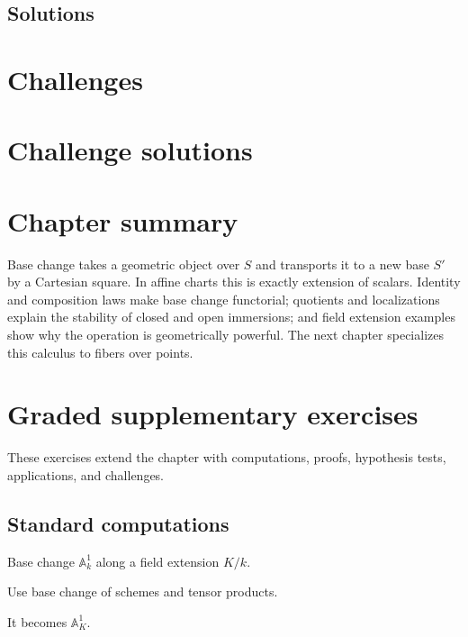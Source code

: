 \subsection*{Solutions}

\fi

\section{Challenges}





\ifdefined\IncludeChallengeSolutions
\section{Challenge solutions}

\fi

\section{Chapter summary}
Base change takes a geometric object over $S$ and transports it to a new base $S'$ by a Cartesian
square.  In affine charts this is exactly extension of scalars.  Identity and composition laws make
base change functorial; quotients and localizations explain the stability of closed and open
immersions; and field extension examples show why the operation is geometrically powerful.  The next
chapter specializes this calculus to fibers over points.



\section{Graded supplementary exercises}
These exercises extend the chapter with computations, proofs, hypothesis tests, applications, and challenges.

\subsection*{Standard computations}

\begin{exercise}\label{exr:vi24-expand-01}
Base change $\mathbb A^1_k$ along a field extension $K/k$.
\end{exercise}
\begin{hint}
Use base change of schemes and tensor products.
\end{hint}
\begin{solution}
It becomes $\mathbb A^1_K$.
\end{solution}


